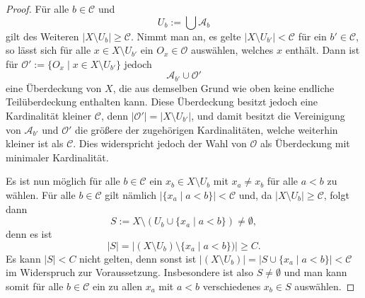 \begin{proof}
  Für alle $b \in \mathcal{C}$ und 
  \begin{displaymath}
  U_b := \bigcup \mathcal{A}_b 
  \end{displaymath}
  gilt des Weiteren $|X \setminus U_b| \geq \mathcal{C}$.
  Nimmt man an, es gelte $|X \setminus U_{b'}| < \mathcal{C}$ für ein $b' \in \mathcal{C}$, so lässt sich für alle $x \in X \setminus U_{b'}$ ein $O_x \in \mathcal{O}$ auswählen, welches $x$ enthält.
  Dann ist für $\mathcal{O}' := \{O_x \mid x \in X \setminus U_{b'}\}$ jedoch
  \begin{displaymath}
    \mathcal{A}_{b'} \cup  \mathcal{O}'
  \end{displaymath}
  eine Überdeckung von $X$, die aus demselben Grund wie oben keine endliche Teilüberdeckung enthalten kann.
  Diese Überdeckung besitzt jedoch eine Kardinalität kleiner $\mathcal{C}$, denn $| \mathcal{O}' | = | X \setminus U_{b'} |$, und damit besitzt die Vereinigung von $\mathcal{A}_{b'}$ und $\mathcal{O}'$ die größere der zugehörigen Kardinalitäten, welche weiterhin kleiner ist als $\mathcal{C}$.
  Dies widerspricht jedoch der Wahl von $\mathcal{O}$ als Überdeckung mit minimaler Kardinalität.

  Es ist nun möglich für alle $b \in \mathcal{C}$ ein $x_b \in X \setminus U_b$ mit $x_a \neq x_b$ für alle $a < b$ zu wählen. 
  Für alle $b \in \mathcal{C}$ gilt nämlich $|\{x_a \mid a < b\}| < \mathcal{C}$ und, da $|X \setminus U_b| \geq \mathcal{C}$, folgt dann
  \begin{displaymath}
    S := X \setminus (U_b \cup \{x_a \mid a < b\}) \neq \emptyset,
  \end{displaymath}
  denn es ist
  \begin{displaymath}
    | S | = | (X \setminus U_b) \setminus \{x_a \mid a < b\}) | \geq C.
  \end{displaymath}
  Es kann $| S | < C$ nicht gelten, denn sonst ist $ |( X \setminus U_b )| = |S \cup \{x_a \mid a < b\}| < \mathcal{C}$ im Widerspruch zur Voraussetzung.
  Insbesondere ist also $S \neq \emptyset$ und man kann somit für alle $b \in \mathcal{C}$ ein zu allen $x_a$ mit $a < b$ verschiedenes $x_b \in S$ auswählen.


\end{proof}
